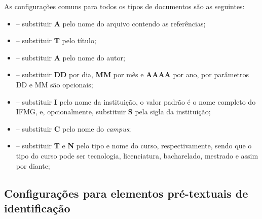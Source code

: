 \documentclass[artigo]{iftex2024}
\begin{document}
As configurações comuns para todos os tipos de documentos são as seguintes:
\begin{itemize}
  \item[]  -- substituir \textbf{A} pelo nome do arquivo contendo as referências;

  \item[]  -- substituir \textbf{T} pelo título;

  \item[]  -- substituir \textbf{A} pelo nome do autor;

  \item[]  -- substituir \textbf{DD} por dia, \textbf{MM} por mês e \textbf{AAAA} por ano, por parâmetros DD e MM são opcionais;

  \item[]  -- substituir \textbf{I} pelo nome da instituição, o valor padrão é o nome completo do IFMG, e, opcionalmente, substituir \textbf{S} pela sigla da instituição;

  \item[]  -- substituir \textbf{C} pelo nome do  \textit{campus};

  \item[]  -- substituir \textbf{T} e \textbf{N} pelo tipo e nome do curso, respectivamente, sendo que o tipo do curso pode ser tecnologia, licenciatura, bacharelado, mestrado e assim por diante;
\end{itemize}

\subsection{Configurações para elementos pré-textuais de identificação} \label{sec:conf_pretextuais}
\end{document}
